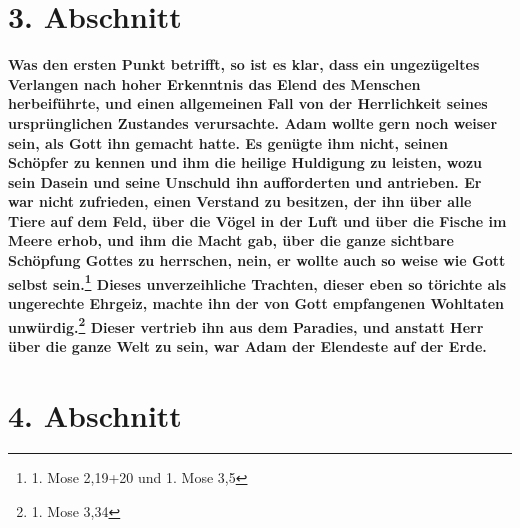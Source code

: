 \section{3. Abschnitt} \label{kap7_ab3}

\label{ref:07_03_wissen_erbsuende}
\textbf{Was den ersten Punkt betrifft, so ist es
klar, dass ein ungezügeltes Verlangen
nach hoher Erkenntnis
 das Elend des Menschen
herbeiführte, und einen allgemeinen
Fall von der Herrlichkeit seines ursprünglichen Zustandes verursachte.
   Adam
wollte gern noch weiser sein, als Gott ihn gemacht hatte. Es genügte ihm nicht,
seinen Schöpfer zu kennen und ihm die heilige Huldigung zu leisten, wozu sein
Dasein und seine Unschuld ihn aufforderten und antrieben. Er war nicht
zufrieden, einen Verstand zu besitzen, der ihn über alle
Tiere auf dem Feld,
über die Vögel in der Luft und über die Fische im Meere erhob, und ihm die Macht
gab, über die ganze sichtbare Schöpfung Gottes zu herrschen, nein, er wollte
auch so weise wie Gott selbst sein.\footnote{1. Mose 2,19+20 und 1. Mose 3,5}
Dieses unverzeihliche Trachten, dieser eben so törichte als ungerechte
Ehrgeiz, machte
ihn der von Gott empfangenen Wohltaten unwürdig.\footnote{1. Mose 3,34}
Dieser vertrieb ihn aus dem Paradies, und
anstatt Herr über die ganze Welt zu sein, war Adam der Elendeste auf der Erde.}

\section{4. Abschnitt} \label{kap7_ab4}

